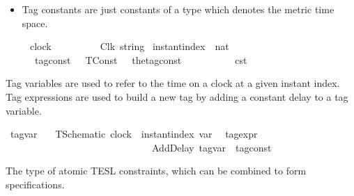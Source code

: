 \begin{isabellebody}
\begin{isamarkuptext}
\begin{itemize}
\item Tag constants are just constants of a type which denotes the metric time space.%
\end{itemize}%
\end{isamarkuptext}\isamarkuptrue%
\isamarkupfalse%
\ \ \ \ \ clock\ \ \ \ \ \ \ \ \ {\isacharequal}\ Clk\ {\isacartoucheopen}string{\isacartoucheclose}\isanewline
{}\isamarkupfalse%
\ instant{\isacharunderscore}index\ {\isacharequal}\ {\isacartoucheopen}nat{\isacartoucheclose}\isanewline
\isanewline
{}\isamarkupfalse%
\ \ \ \ \ {\isacharprime}{\isasymtau}\ tag{\isacharunderscore}const\ {\isacharequal}\ \ TConst\ \ \ {\isacharparenleft}the{\isacharunderscore}tag{\isacharunderscore}const\ {\isacharcolon}\ {\isacharprime}{\isasymtau}{\isacharparenright}\ \ \ \ \ \ \ \ \ {\isacharparenleft}{\isacartoucheopen}{\isasymtau}\isactrlsub c\isactrlsub s\isactrlsub t{\isacartoucheclose}{\isacharparenright}%
\begin{isamarkuptext}%
Tag variables are used to refer to the time on a clock at a given instant index.
  Tag expressions are used to build a new tag by adding a constant delay to a tag variable.%
\end{isamarkuptext}\isamarkuptrue%
\isamarkupfalse%
\ tag{\isacharunderscore}var\ {\isacharequal}\isanewline
\ \ TSchematic\ {\isacartoucheopen}clock\ {\isacharasterisk}\ instant{\isacharunderscore}index{\isacartoucheclose}\ {\isacharparenleft}{\isacartoucheopen}{\isasymtau}\isactrlsub v\isactrlsub a\isactrlsub r{\isacartoucheclose}{\isacharparenright}\isanewline
{}\isamarkupfalse%
\ {\isacharprime}{\isasymtau}\ tag{\isacharunderscore}expr\ \ \ \ \ \ {\isacharequal}\ \ \isanewline
\ \ \ \ \ \ \ \ \ \ \ \ \ \ \ \ \ \ \ \ \ \ \ \ \ \ \ \ \ \ AddDelay\ {\isacartoucheopen}tag{\isacharunderscore}var{\isacartoucheclose}\ {\isacartoucheopen}{\isacharprime}{\isasymtau}\ tag{\isacharunderscore}const{\isacartoucheclose}\ {\isacharparenleft}{\isacartoucheopen}{\isasymlparr}\ {\isacharunderscore}\ {\isasymoplus}\ {\isacharunderscore}\ {\isasymrparr}{\isacartoucheclose}{\isacharparenright}%
\isadelimdocument
%
\endisadelimdocument
%
\isatagdocument
%
\isamarkuptrue%
%
\endisatagdocument
{\isafolddocument}%
%
\isadelimdocument
%
\endisadelimdocument
%
\begin{isamarkuptext}%
The type of atomic TESL constraints, which can be combined to form specifications.%
\end{isamarkuptext}\isamarkuptrue%

\end{isabellebody}
